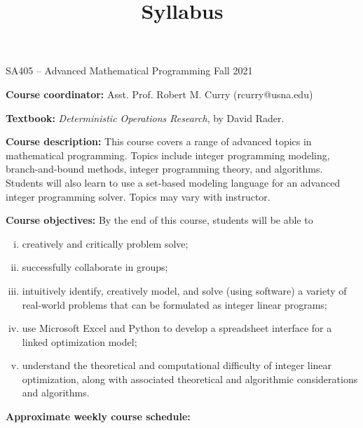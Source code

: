 \documentclass[12pt]{article}
\makeatletter
\theoremstyle{definition}
\newcommand{\graphbox}[5]%
{
\begin{tikzpicture}
     [>=latex,scale=#5]
     
     \draw [->,very thick] (#1, 0) -- (#2, 0) node[right] {$x$};
     \draw [->,very thick] (0, #3) -- (0, #4) node[above] {$y$};
     
     \draw[step=1cm,thick,dotted] (#1,#3) grid (#2,#4);
   \end{tikzpicture}
   }
\renewcommand{\maketitle}{
  \noindent SA405 -- Advanced Mathematical Programming \hfill Fall 2021

  \begin{center}\large{\textbf{\@title}}\end{center}
}
\makeatother
\begin{document}

\title{Syllabus}


\maketitle

\noindent \textbf{Course coordinator:}  Asst. Prof. Robert M. Curry  (rcurry@usna.edu)

\noindent \textbf{Textbook:}  \emph{Deterministic Operations Research}, by David Rader.

\noindent \textbf{Course description: }This course covers a range of advanced topics in mathematical programming. Topics include integer programming modeling, branch-and-bound methods, integer programming theory,  and algorithms. Students will also learn to use a set-based modeling language for an advanced integer programming solver. Topics may vary with instructor.

\noindent \textbf{Course objectives:}  By the end of this course, students will be able to
\vspace{-2mm}
\begin{enumerate}[(i)]
\item creatively and critically problem solve;
\item successfully collaborate in groups;
\item intuitively identify, creatively model, and solve (using software) a variety of real-world problems that can be formulated as integer linear programs;
\item use Microsoft Excel and Python to develop a spreadsheet interface for a linked optimization model;
\item understand the theoretical and computational difficulty of integer linear optimization, along with associated theoretical and algorithmic considerations and algorithms.
\end{enumerate}
\noindent \textbf{Approximate weekly course schedule:} 
\end{document}
